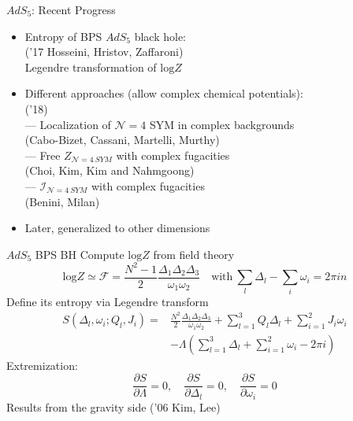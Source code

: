 \documentclass{beamer}
\begin{document}
\begin{frame}{$AdS_5$: Recent Progress}
    \begin{itemize}
        \item Entropy of BPS $AdS_5$ black hole:\\ {\color{blue}('17 Hosseini, Hristov, Zaffaroni)}\\
        Legendre transformation of $\mathrm{log}Z$
        \item Different approaches (allow complex chemical potentials):{\color{blue} \\('18)}\\
        --- Localization of $\mathcal{N}=4$ 
        SYM in complex backgrounds\\
        {\color{blue}(Cabo-Bizet, Cassani, Martelli, Murthy)}\\
        --- Free $Z_{\mathcal{N}=4\ SYM}$ with complex fugacities\\
        {\color{blue}(Choi, Kim, Kim and Nahmgoong)}\\
        --- $\mathcal{I}_{\mathcal{N}=4\ SYM}$ with complex fugacities\\
        {\color{blue}(Benini, Milan)}\\
        \item Later, generalized to other dimensions
    \end{itemize}
\end{frame}

\begin{frame}{$AdS_5$ BPS BH}
    Compute $\mathrm{log}Z$ from field theory
    \begin{equation*}
        \mathrm{log}Z\simeq \mathcal{F}=\frac{N^2-1}{2}\frac{\Delta_1\Delta_2\Delta_3}{\omega_1\omega_2}\quad\text{with}\ \sum_l\Delta_l-\sum_i\omega_i=2\pi in
    \end{equation*}
    Define its entropy via Legendre transform
    \begin{equation*}
    \begin{split}
        S(\Delta_l,\omega_i;Q_l,J_i)=&\frac{N^2}{2}\frac{\Delta_1\Delta_2\Delta_3}{\omega_1\omega_2}+\sum_{l=1}^3Q_l\Delta_l+\sum_{i=1}^2J_i\omega_i\\
        &-\Lambda(\sum_{l=1}^3\Delta_l+\sum_{i=1}^2\omega_i-2\pi i)
    \end{split}
    \end{equation*}
    Extremization:
    \begin{equation*}
        \frac{\partial S}{\partial \Lambda}=0,\quad \frac{\partial S}{\partial \Delta_l}=0,\quad\frac{\partial S}{\partial \omega_i}=0
    \end{equation*}
    Results from the gravity side {\color{blue}('06 Kim, Lee)}
\end{frame}
\end{document}
